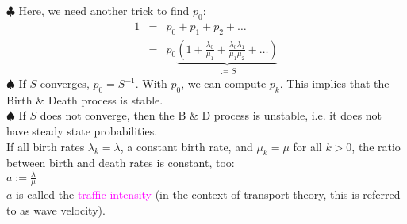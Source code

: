 \documentclass[20pt,landscape]{foils}
\newcommand{\no}{\noindent}
\begin{document}
{%
\no $\clubsuit$ Here, we need another trick to find $p_0$:
\begin{eqnarray*}
1 &=& p_{0} + p_{1} + p_{2} + \ldots \\
&=& p_{0} \underbrace{\left ( 1 + \frac{\lambda_{0}}{\mu_{1}} +
\frac{\lambda_{0}\lambda_{1}}{\mu_{1}\mu_{2}}+ \ldots \right )}_{:= S}
\end{eqnarray*}
\no $\spadesuit$ If $S$ converges, $p_0 = S^{-1}$. With $p_0$, we can compute $p_k$. This implies that the Birth \& Death process is stable.
\\[.1in]
\no $\spadesuit$ If $S$ does not converge, then the B \& D process is unstable, i.e. it does not have steady state probabilities.
\foilhead[-.8in]{\textcolor{blue}{Special Case: constant birth and death rates}}
\no  {\textcolor{magenta}{Traffic intensity:}} \\[.1in]
\no If all birth rates $\lambda_k = \lambda$, a constant birth rate, and $\mu_k = \mu$ for all $k>0$,
the ratio between birth and death rates is constant, too:\\[.1in]
\hspace*{2in} $a := \frac{\lambda}{\mu}$\\[.1in]
$a$ is called the   {\textcolor{magenta}{traffic intensity}} (in the context of transport theory, this is referred to as wave velocity).\\[.1in]
}
\end{document}
